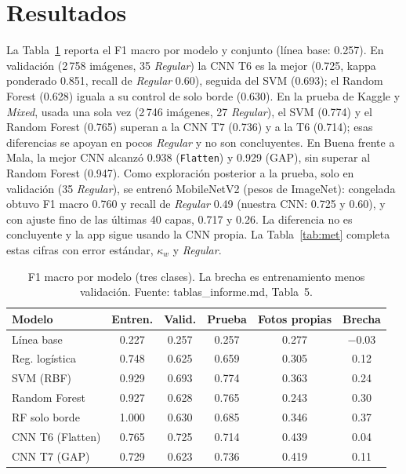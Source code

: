 \documentclass[conference]{IEEEtran}
\begin{document}
\section{Resultados}\label{sec:res}
La Tabla~\ref{tab:res} reporta el F1 macro por modelo y conjunto (l\'inea base: 0.257). En validaci\'on (2\,758 im\'agenes, 35 \emph{Regular}) la CNN T6 es la mejor (0.725, kappa ponderado 0.851, recall de \emph{Regular} 0.60), seguida del SVM (0.693); el Random Forest (0.628) iguala a su control de solo borde (0.630). En la prueba de Kaggle y \emph{Mixed}, usada una sola vez (2\,746 im\'agenes, 27 \emph{Regular}), el SVM (0.774) y el Random Forest (0.765) superan a la CNN T7 (0.736) y a la T6 (0.714); esas diferencias se apoyan en pocos \emph{Regular} y no son concluyentes. En Buena frente a Mala, la mejor CNN alcanz\'o 0.938 (\texttt{Flatten}) y 0.929 (GAP), sin superar al Random Forest (0.947). Como exploraci\'on posterior a la prueba, solo en validaci\'on (35 \emph{Regular}), se entren\'o MobileNetV2 \cite{sandler2018mobilenetv2} (pesos de ImageNet): congelada obtuvo F1 macro 0.760 y recall de \emph{Regular} 0.49 (nuestra CNN: 0.725 y 0.60), y con ajuste fino de las \'ultimas 40 capas, 0.717 y 0.26. La diferencia no es concluyente y la app sigue usando la CNN propia. La Tabla~\ref{tab:met} completa estas cifras con error est\'andar, $\kappa_w$ y \emph{Regular}.

\begin{table}[t]
\centering
\caption{F1 macro por modelo (tres clases). La brecha es entrenamiento menos validaci\'on. Fuente: {\normalfont\ttfamily tablas\_informe.md}, Tabla~5.}
\label{tab:res}
\scriptsize
\begin{tabular}{@{}lccccc@{}}
\toprule
Modelo & Entren. & Valid. & Prueba & Fotos propias & Brecha \\
\midrule
L\'inea base & 0.227 & 0.257 & 0.257 & 0.277 & $-0.03$ \\
Reg. log\'istica & 0.748 & 0.625 & 0.659 & 0.305 & 0.12 \\
SVM (RBF) & 0.929 & 0.693 & 0.774 & 0.363 & 0.24 \\
Random Forest & 0.927 & 0.628 & 0.765 & 0.243 & 0.30 \\
RF solo borde & 1.000 & 0.630 & 0.685 & 0.346 & 0.37 \\
CNN T6 (Flatten) & 0.765 & 0.725 & 0.714 & 0.439 & 0.04 \\
CNN T7 (GAP) & 0.729 & 0.623 & 0.736 & 0.419 & 0.11 \\
\bottomrule
\end{tabular}
\end{table}
\end{document}
